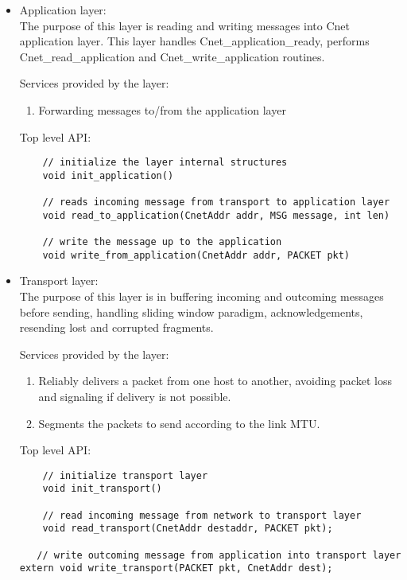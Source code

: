 \documentclass{article}
\begin{document}
\begin{itemize}
  \item Application layer: \\
		The purpose of this layer is reading and writing messages into Cnet
		application layer. This layer handles Cnet\_application\_ready, performs
		Cnet\_read\_application and Cnet\_write\_application routines.
		
		Services provided by the layer:
		\begin{enumerate}
		  \item Forwarding messages to/from the application layer 
		\end{enumerate}
	
	Top level API:
	\begin{verbatim}
    // initialize the layer internal structures
    void init_application()
		
    // reads incoming message from transport to application layer
    void read_to_application(CnetAddr addr, MSG message, int len) 
    
    // write the message up to the application
    void write_from_application(CnetAddr addr, PACKET pkt)    
	\end{verbatim}
		
\item	Transport layer: \\
		The purpose of this layer is in buffering incoming and outcoming
		 messages before sending, handling sliding window paradigm, 
		 acknowledgements, resending lost and corrupted fragments.
		
		Services provided by the layer:
    \begin{enumerate}
      \item Reliably delivers a packet from one host to another, avoiding
       packet loss and signaling if delivery is not possible.
      \item Segments the packets to send according to the link MTU.
    \end{enumerate}
		
		Top level API:
  \begin{verbatim}
    // initialize transport layer
    void init_transport()
		
    // read incoming message from network to transport layer
    void read_transport(CnetAddr destaddr, PACKET pkt);
    
   // write outcoming message from application into transport layer
extern void write_transport(PACKET pkt, CnetAddr dest);
		

\end{verbatim}
\end{itemize}
\end{document}
